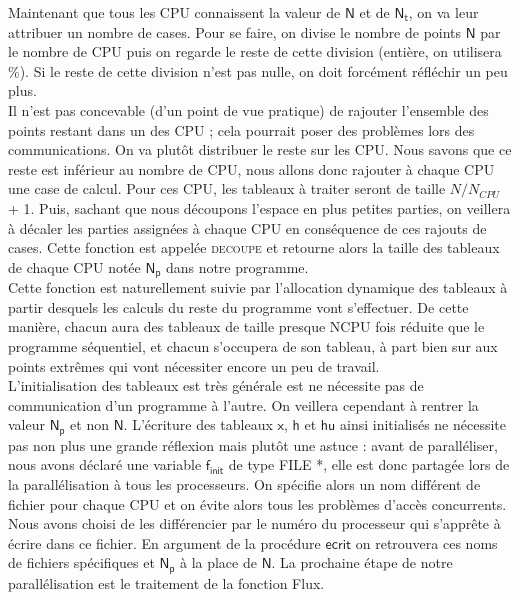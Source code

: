 \documentclass[french]{article}
\newcommand{\xhhu}{$\mathsf{x}$, $\mathsf{h}$ et $\mathsf{hu}$}
\begin{document}
\noindent Maintenant que tous les CPU connaissent la valeur de $\mathsf{N}$ et de $\mathsf{N_t}$, on va leur attribuer un nombre de cases. Pour se faire, on divise le nombre de points $\mathsf{N}$ par le nombre de CPU puis on regarde le reste de cette division (entière, on utilisera \%). Si le reste de cette division n'est pas nulle, on doit forcément réfléchir un peu plus.\\
Il n'est pas concevable (d'un point de vue pratique) de rajouter l'ensemble des points restant dans un des CPU ; cela pourrait poser des problèmes lors des communications. On va plutôt distribuer le reste sur les CPU. Nous savons que ce reste est inférieur au nombre de CPU, nous allons donc rajouter à chaque CPU une case de calcul. Pour ces CPU, les tableaux à traiter seront de taille $N/N_{CPU}$ + 1. Puis, sachant que nous découpons l'espace en plus petites parties, on veillera à décaler les parties assignées à chaque CPU en conséquence de ces rajouts de cases. Cette fonction est appelée \textsc{decoupe} et retourne alors la taille des tableaux de chaque CPU notée $\mathsf{N_p}$ dans notre programme. \\
 Cette fonction est naturellement suivie par l'allocation dynamique des tableaux à partir desquels les calculs du reste du programme vont s'effectuer. De cette manière, chacun aura des tableaux de taille presque NCPU fois réduite que le programme séquentiel, et chacun s'occupera de son tableau, à part bien sur aux points extrêmes qui vont nécessiter encore un peu de travail.\\
L'initialisation des tableaux est très générale est ne nécessite pas de communication d'un programme à l'autre. On veillera cependant à rentrer la valeur $\mathsf{N_p}$ et non $\mathsf{N}$. L'écriture des tableaux \xhhu $ $ ainsi initialisés ne nécessite pas non plus une grande réflexion mais plutôt une astuce : avant de paralléliser, nous avons déclaré une variable $\mathsf{f_{init}}$ de type \textsc{FILE *}, elle est donc partagée lors de la parallélisation à tous les processeurs. On spécifie alors un nom différent de fichier pour chaque CPU et on évite alors tous les problèmes d'accès concurrents. Nous avons choisi de les différencier par le numéro du processeur qui s'apprête à écrire dans ce fichier. En argument de la procédure $\mathsf{ecrit}$ on retrouvera ces noms de fichiers spécifiques et $\mathsf{N_p}$ à la place de $\mathsf{N}$. La prochaine étape de notre parallélisation est le traitement de la fonction Flux. 

\pagebreak
\end{document}
